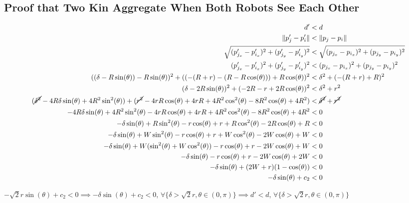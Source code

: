 \documentclass[conference]{IEEEtran}
\begin{document}
  \subsection{Proof that Two Kin Aggregate When Both Robots See Each Other} \label{apx:two_agg_2}

    {%
      \setlength{\belowdisplayskip}{3pt}%
      \setlength{\abovedisplayskip}{3pt}%
      \begin{align*}
        d' &< d \\
        \lVert p'_j - p'_i \rVert &< \lVert p_j - p_i \rVert \\
        \sqrt{(p'_{j_x} - p'_{i_x})^2 + (p'_{j_y} - p'_{i_y})^2} &< \sqrt{(p_{j_x} - p_{i_x})^2 + (p_{j_y} - p_{i_y})^2} \\
        (p'_{j_x} - p'_{i_x})^2 + (p'_{j_y} - p'_{i_y})^2 &< (p_{j_x} - p_{i_x})^2 + (p_{j_y} - p_{i_y})^2 \\
        ((\delta - R\sin(\theta)) - R\sin(\theta))^2 + ((-(R+r)-(R-R\cos(\theta))) + R\cos(\theta))^2 &< \delta^2 + (-(R+r) + R)^2 \\
        (\delta - 2R\sin(\theta))^2 + (-2R-r+2R\cos(\theta))^2 &< \delta^2 + r^2 \\
        (\cancel{\delta^2} - 4R\delta\sin(\theta) + 4R^2\sin^2(\theta)) + (\cancel{r^2}-4rR\cos(\theta)+4rR+4R^2\cos^2(\theta)- 8R^2\cos(\theta) + 4R^2) &< \cancel{\delta^2} + \cancel{r^2} \\
        -4R\delta\sin(\theta) + 4R^2\sin^2(\theta) - 4rR\cos(\theta)+4rR+4R^2\cos^2(\theta)- 8R^2\cos(\theta) + 4R^2 &< 0 \\
        -\delta\sin(\theta) + R\sin^2(\theta) - r\cos(\theta) + r + R\cos^2(\theta)- 2R\cos(\theta) + R &< 0 \\
        -\delta\sin(\theta) + W\sin^2(\theta) - r\cos(\theta) + r + W\cos^2(\theta)- 2W\cos(\theta) + W &< 0 \\
        -\delta\sin(\theta) + W(\sin^2(\theta) + W\cos^2(\theta)) - r\cos(\theta) + r - 2W\cos(\theta) + W &< 0 \\
        -\delta\sin(\theta) - r\cos(\theta) + r - 2W\cos(\theta) + 2W &< 0 \\
        -\delta\sin(\theta) + (2W+r)(1- \cos(\theta)) &< 0 \\
        -\delta\sin(\theta) + c_2 &< 0
      \end{align*}
    }

    $-\sqrt{2}r\sin(\theta) + c_2<0 \implies -\delta\sin(\theta) + c_2<0$, $\forall \{\delta > \sqrt{2}r, \theta\in(0,\pi)\} \implies d'<d$, $\forall \{\delta > \sqrt{2}r, \theta\in(0,\pi)\}$
\end{document}
